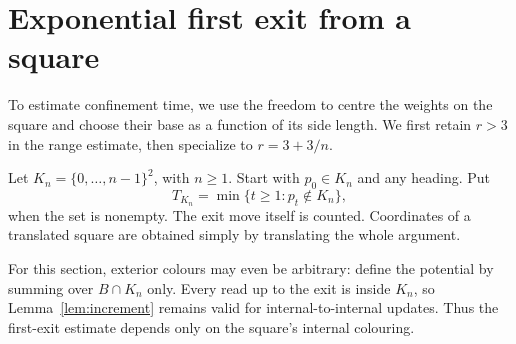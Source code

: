 \documentclass[11pt,a4paper]{article}
\theoremstyle{remark}\newtheorem{remark}[theorem]{Remark}
\begin{document}
\section{Exponential first exit from a square}
To estimate confinement time, we use the freedom to centre the weights on
the square and choose their base as a function of its side length. We first
retain $r>3$ in the range estimate, then specialize to $r=3+3/n$.

Let $K_n=\{0,\ldots,n-1\}^2$, with $n\ge1$. Start with $p_0\in K_n$ and
any heading. Put
\[
 T_{K_n}=\min\{t\ge1:p_t\notin K_n\},
\]
when the set is nonempty. The exit move itself is counted. Coordinates of a
translated square are obtained simply by translating the whole argument.

For this section, exterior colours may even be arbitrary: define the potential
by summing over $B\cap K_n$ only. Every read up to the exit is inside $K_n$,
so Lemma~\ref{lem:increment} remains valid for internal-to-internal updates.
Thus the first-exit estimate depends only on the square's internal colouring.
\end{document}
